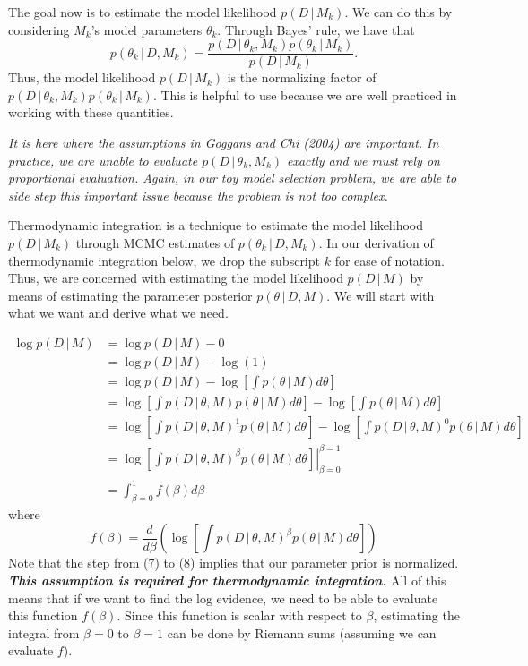 \documentclass[11pt]{article}
\begin{document}
The goal now is to estimate the model likelihood $p(D\,|\, M_k)$. 
We can do this by considering $M_k$'s model parameters $\theta_k$.
Through Bayes' rule, we have that
\begin{equation}
 p(\theta_k \,|\, D , M_k) = \frac{ p(D\,|\,\theta_k,M_k)p(\theta_k\,|\, M_k)}{p(D\,|\, M_k)}.
\end{equation}
Thus, the model likelihood $p(D\,|\, M_k)$ is the normalizing factor of $ p(D\,|\,\theta_k,M_k)p(\theta_k\,|\, M_k)$.
This is helpful to use because we are well practiced in working with these quantities.

\textit{It is here where the assumptions in Goggans and Chi (2004) are important.
In practice, we are unable to evaluate $p(D\,|\,\theta_k,M_k)$ exactly and we must rely on proportional evaluation.
Again, in our toy model selection problem, we are able to side step this important issue because the problem is not too complex.}

Thermodynamic integration is a technique to estimate the model likelihood $p(D\,|\, M_k)$ through MCMC estimates of $p(\theta_k \,|\, D , M_k) $.
In our derivation of thermodynamic integration below, we drop the subscript $k$ for ease of notation.
Thus, we are concerned with estimating the model likelihood $p(D\,|\, M)$ by means of estimating the parameter posterior 
$p(\theta \,|\, D , M).$
We will start with what we want and derive what we need.

\begin{align}
\log p(D\,|\, M) & = \log p(D\,|\, M) - 0\\
& = \log p(D\,|\, M) -\log(1)\\
&= \log p(D\,|\, M) - \log\left[\int p(\theta\,|\, M)d\theta \right]\\
&=\log \left[\int p(D\,|\,\theta,M)p(\theta\,|\, M) d\theta \right]- \log\left[\int p(\theta\,|\, M)d\theta \right]\\
&=\log \left[\int p(D\,|\,\theta,M)^1p(\theta\,|\, M) d\theta \right]- \log\left[\int p(D\,|\,\theta,M)^0p(\theta\,|\, M)d\theta \right]\\
&= \left. \log \left[\int p(D\,|\,\theta,M)^\beta p(\theta\,|\, M) d\theta \right]\right|^{\beta=1}_{\beta=0}\\
&= \int_{\beta=0}^1 f(\beta) d\beta
\end{align}
where 
\begin{equation}
f(\beta) = \frac{d}{d\beta} \left(\log \left[\int p(D\,|\,\theta,M)^\beta p(\theta\,|\, M) d\theta \right]\right) 
\end{equation}
Note that the step from (7) to (8) implies that our parameter prior is normalized. \textit{\textbf{This assumption is required for thermodynamic integration.}}
All of this means that if we want to find the log evidence, we need to be able to evaluate this function $f(\beta)$.
Since this function is scalar with respect to $\beta$, estimating the integral from $\beta=0$ to $\beta=1$ can be done by Riemann sums (assuming we can evaluate $f$).
\end{document}
